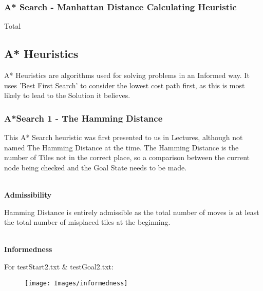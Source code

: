 \documentclass[11pt]{article} %
\begin{document}
			\subsubsection{A* Search - Manhattan Distance Calculating Heuristic}

				\begin{algorithmic}
					  \ENDFOR \RETURN Total 

				\end{algorithmic}

	\newpage
		\subsection{A* Heuristics}

			A* Heuristics are algorithms used for solving problems in an Informed way. It uses 'Best First Search' to consider the lowest cost path first, as this is most likely to lead to the Solution it believes.
	
			\subsubsection{A*Search 1 - The Hamming Distance}

				This A* Search heuristic was first presented to us in Lectures, although not named The Hamming Distance at the time. The Hamming Distance is the number of Tiles not in the correct place, so a comparison between the current node being checked and the Goal State needs to be made.

				\setlength{\parindent}{0pt} %
				\hspace{0pt} \\
				\textbf{Admissibility}

				Hamming Distance is entirely admissible as the total number of moves is at least the total number of misplaced tiles at the beginning.
					
				\hspace{0pt} \\
				\textbf{Informedness}

				For testStart2.txt \& testGoal2.txt:
					\begin{figure}[ht!]
					\centering
					\texttt{[image: Images/informedness]}
					\label{overflow}
					\end{figure}
	
\end{document}
